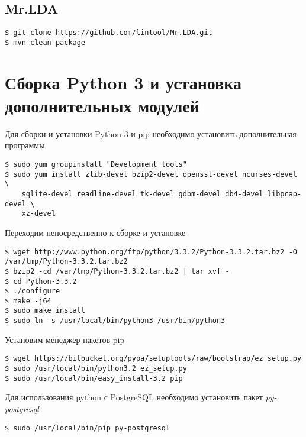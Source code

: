 \subsection{Mr.LDA}
\begin{lstlisting}
$ git clone https://github.com/lintool/Mr.LDA.git
$ mvn clean package
\end{lstlisting}

\section{Сборка Python 3 и установка дополнительных модулей}
Для сборки и установки Python 3 и pip необходимо установить дополнительная программы
\begin{lstlisting}
$ sudo yum groupinstall "Development tools"
$ sudo yum install zlib-devel bzip2-devel openssl-devel ncurses-devel \
    sqlite-devel readline-devel tk-devel gdbm-devel db4-devel libpcap-devel \
    xz-devel
\end{lstlisting}
Переходим непосредственно к сборке и установке\cite{python}
\begin{lstlisting}
$ wget http://www.python.org/ftp/python/3.3.2/Python-3.3.2.tar.bz2 -O /var/tmp/Python-3.3.2.tar.bz2
$ bzip2 -cd /var/tmp/Python-3.3.2.tar.bz2 | tar xvf -
$ cd Python-3.3.2
$ ./configure
$ make -j64
$ sudo make install
$ sudo ln -s /usr/local/bin/python3 /usr/bin/python3
\end{lstlisting}

Установим менеджер пакетов pip\cite{pip}
\begin{lstlisting}
$ wget https://bitbucket.org/pypa/setuptools/raw/bootstrap/ez_setup.py
$ sudo /usr/local/bin/python3.2 ez_setup.py
$ sudo /usr/local/bin/easy_install-3.2 pip
\end{lstlisting}

Для использования python с PostgreSQL необходимо установить пакет \emph{py-postgresql}
\begin{lstlisting}
$ sudo /usr/local/bin/pip py-postgresql
\end{lstlisting}

